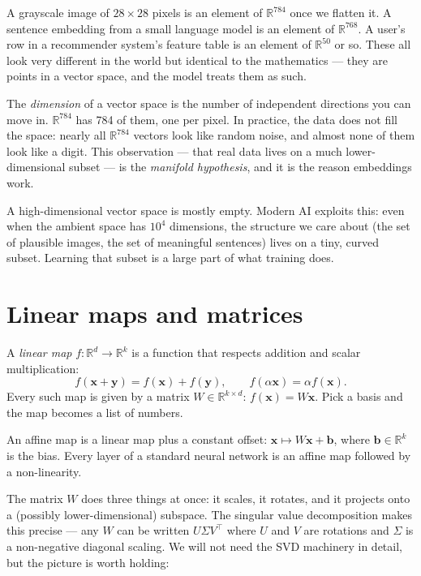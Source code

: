 \begin{example}
A grayscale image of $28 \times 28$ pixels is an element of $\mathbb{R}^{784}$ once we flatten it. A sentence embedding from a small language model is an element of $\mathbb{R}^{768}$. A user's row in a recommender system's feature table is an element of $\mathbb{R}^{50}$ or so. These all look very different in the world but identical to the mathematics --- they are points in a vector space, and the model treats them as such.
\end{example}

The \emph{dimension} of a vector space is the number of independent directions you can move in. $\mathbb{R}^{784}$ has 784 of them, one per pixel. In practice, the data does not fill the space: nearly all $\mathbb{R}^{784}$ vectors look like random noise, and almost none of them look like a digit. This observation --- that real data lives on a much lower-dimensional subset --- is the \emph{manifold hypothesis}, and it is the reason embeddings work.

\begin{intuition}
A high-dimensional vector space is mostly empty. Modern AI exploits this: even when the ambient space has $10^4$ dimensions, the structure we care about (the set of plausible images, the set of meaningful sentences) lives on a tiny, curved subset. Learning that subset is a large part of what training does.
\end{intuition}

\section{Linear maps and matrices}

A \emph{linear map} $f: \mathbb{R}^d \to \mathbb{R}^k$ is a function that respects addition and scalar multiplication:
\[
f(\bm{x} + \bm{y}) = f(\bm{x}) + f(\bm{y}), \qquad f(\alpha \bm{x}) = \alpha f(\bm{x}).
\]
Every such map is given by a matrix $W \in \mathbb{R}^{k \times d}$: $f(\bm{x}) = W \bm{x}$. Pick a basis and the map becomes a list of numbers.

\begin{definition}
An affine map is a linear map plus a constant offset: $\bm{x} \mapsto W \bm{x} + \bm{b}$, where $\bm{b} \in \mathbb{R}^k$ is the bias. Every layer of a standard neural network is an affine map followed by a non-linearity.
\end{definition}

The matrix $W$ does three things at once: it scales, it rotates, and it projects onto a (possibly lower-dimensional) subspace. The singular value decomposition makes this precise --- any $W$ can be written $U \Sigma V^\top$ where $U$ and $V$ are rotations and $\Sigma$ is a non-negative diagonal scaling. We will not need the SVD machinery in detail, but the picture is worth holding:

